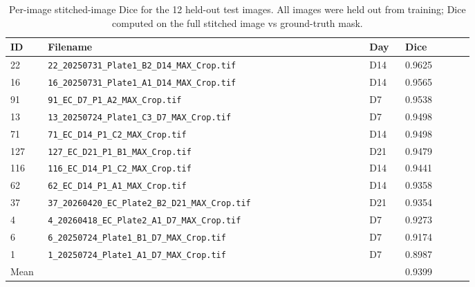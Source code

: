 \documentclass[11pt,letterpaper]{article}
\begin{document}
\begin{table}[htbp]
\centering
\caption{Per-image stitched-image Dice for the 12 held-out test images. All images were held out from training; Dice computed on the full stitched image vs ground-truth mask.}
\begin{tabular}{p{0.04\linewidth}p{0.56\linewidth}p{0.06\linewidth}p{0.12\linewidth}}
\toprule
ID & Filename & Day & Dice \\
\midrule
22  & \nolinkurl{22_20250731_Plate1_B2_D14_MAX_Crop.tif}      & D14 & 0.9625 \\
16  & \nolinkurl{16_20250731_Plate1_A1_D14_MAX_Crop.tif}      & D14 & 0.9565 \\
91  & \nolinkurl{91_EC_D7_P1_A2_MAX_Crop.tif}                 & D7  & 0.9538 \\
13  & \nolinkurl{13_20250724_Plate1_C3_D7_MAX_Crop.tif}       & D7  & 0.9498 \\
71  & \nolinkurl{71_EC_D14_P1_C2_MAX_Crop.tif}                & D14 & 0.9498 \\
127 & \nolinkurl{127_EC_D21_P1_B1_MAX_Crop.tif}               & D21 & 0.9479 \\
116 & \nolinkurl{116_EC_D14_P1_C2_MAX_Crop.tif}               & D14 & 0.9441 \\
62  & \nolinkurl{62_EC_D14_P1_A1_MAX_Crop.tif}                & D14 & 0.9358 \\
37  & \nolinkurl{37_20260420_EC_Plate2_B2_D21_MAX_Crop.tif}   & D21 & 0.9354 \\
4   & \nolinkurl{4_20260418_EC_Plate2_A1_D7_MAX_Crop.tif}     & D7  & 0.9273 \\
6   & \nolinkurl{6_20250724_Plate1_B1_D7_MAX_Crop.tif}        & D7  & 0.9174 \\
1   & \nolinkurl{1_20250724_Plate1_A1_D7_MAX_Crop.tif}        & D7  & 0.8987 \\
\midrule
Mean & & & 0.9399 \\
\bottomrule
\end{tabular}
\label{tab:per-image-dice}
\end{table}
\end{document}
